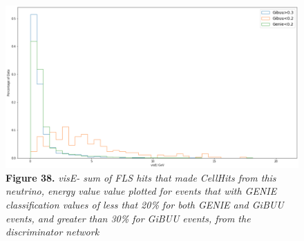\begin{figure}[t!]
 \centering
 \includegraphics[width=160mm]{Descr/visE.png}
 \textbf{Figure 38.} \textit{visE- sum of FLS hits that made CellHits from this neutrino, energy value value plotted for events that with GENIE classification values of less that 20\% for both GENIE and GiBUU events, and greater than 30\% for GiBUU events, from the discriminator network}
\end{figure}

\newpage
